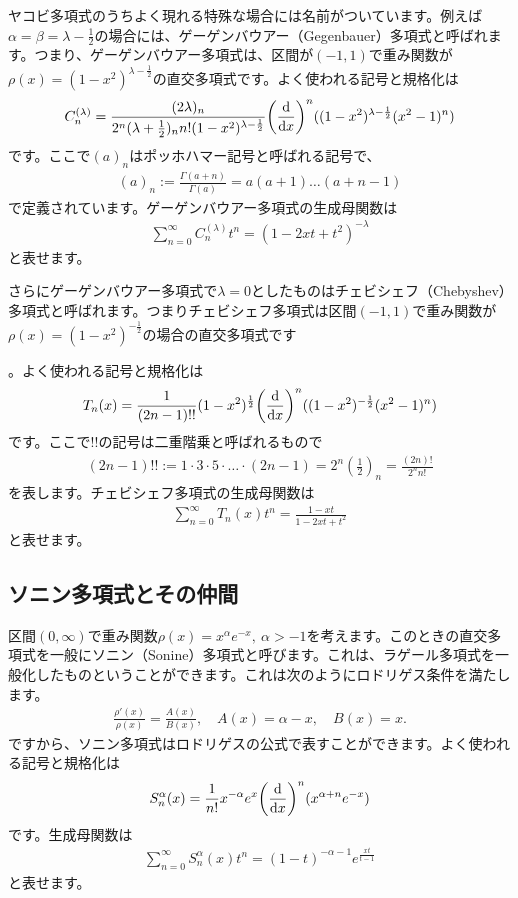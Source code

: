 \documentclass[report,paper=a4, fontsize=12pt, line_length=16cm, number_of_lines=33,dvipdfmx]{jlreq}
\numberwithin{equation}{section}
\begin{document}
ヤコビ多項式のうちよく現れる特殊な場合には名前がついています。例えば$\alpha=\beta=\lambda-\frac12$の場合には、ゲーゲンバウアー（Gegenbauer）多項式と呼ばれます。つまり、ゲーゲンバウアー多項式は、区間が$(-1,1)$で重み関数が$\rho(x)=(1-x^2)^{\lambda-\frac12}$の直交多項式です。よく使われる記号と規格化は
\begin{align}
  C^{(\lambda)}_{n}=\frac{(2\lambda)_n}{2^n (\lambda+\frac12)_n n!(1-x^2)^{\lambda-\frac12}}
  \qty(\dv{x})^n((1-x^2)^{\lambda-\frac12}(x^2-1)^n)
\end{align}
です。ここで$(a)_n$はポッホハマー記号と呼ばれる記号で、
\begin{align}
  (a)_n:=\frac{\Gamma(a+n)}{\Gamma(a)}=a(a+1)\dots(a+n-1)
\end{align}
で定義されています。ゲーゲンバウアー多項式の生成母関数は
\begin{align}
  \sum_{n=0}^{\infty}C^{(\lambda)}_{n}t^n=(1-2xt+t^2)^{-\lambda}
\end{align}
と表せます。

さらにゲーゲンバウアー多項式で$\lambda=0$としたものはチェビシェフ（Chebyshev）多項式と呼ばれます。つまりチェビシェフ多項式は区間$(-1,1)$で重み関数が$\rho(x)=(1-x^2)^{-\frac12}$の場合の直交多項式です

。よく使われる記号と規格化は
\begin{align}
  T_n(x)=\frac{1}{(2n-1)!!}(1-x^2)^{\frac12}
  \qty(\dv{x})^n((1-x^2)^{-\frac12}(x^2-1)^n)
\end{align}
です。ここで$!!$の記号は二重階乗と呼ばれるもので
\begin{align}
  (2n-1)!!:=1\cdot 3\cdot 5 \cdot \dots \cdot (2n-1)
  =2^n(\frac12)_n=\frac{(2n)!}{2^n n!}
\end{align}
を表します。チェビシェフ多項式の生成母関数は
\begin{align}
  \sum_{n=0}^{\infty}T_n(x)t^n = \frac{1-xt}{1-2xt+t^2}
\end{align}
と表せます。

\subsection{ソニン多項式とその仲間}
区間$(0,\infty)$で重み関数$\rho(x)=x^{\alpha}e^{-x},\ \alpha>-1$を考えます。このときの直交多項式を一般にソニン（Sonine）多項式と呼びます。これは、ラゲール多項式を一般化したものということができます。これは次のようにロドリゲス条件を満たします。
\begin{align}
  \frac{\rho'(x)}{\rho(x)}=\frac{A(x)}{B(x)},\quad A(x)=\alpha-x,\quad B(x)=x.
\end{align}
ですから、ソニン多項式はロドリゲスの公式で表すことができます。よく使われる記号と規格化は
\begin{align}
  S^{\alpha}_{n}(x)=\frac{1}{n!}x^{-\alpha}e^{x}\qty(\dv{x})^n(x^{\alpha+n}e^{-x})
\end{align}
です。生成母関数は
\begin{align}
  \sum_{n=0}^{\infty}S^{\alpha}_{n}(x)t^n=(1-t)^{-\alpha-1}e^{\frac{xt}{t-1}}
\end{align}
と表せます。
\end{document}

